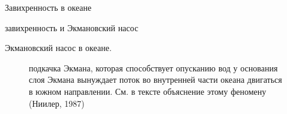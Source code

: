 \begin{chapter}{Завихренность в океане}
\begin{section}{завихренность и Экмановский насос}
\begin{paragraph}{Экмановский насос в океане.}
\begin{figure}[t]
\caption{подкачка Экмана, которая способствует опусканию вод у
основания слоя Экмана вынуждает поток во внутренней части океана
двигаться в южном направлении. См. в тексте объяснение этому феномену
(Ниилер, 1987) } 
\label{fig:vorticity}
\vfill
\vspace{-3ex}
\end{figure}
\end{paragraph}
%
%


\end{section}
\end{chapter}
